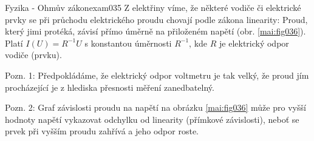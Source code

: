 \begin{mathexam}{Fyzika - Ohmův zákon}{exam035}
  Z elektřiny víme, že některé vodiče či elektrické prvky se při průchodu elektrického proudu
  chovají podle zákona linearity: Proud, který jimi protéká, závisí přímo úměrně na přiloženém
  napětí (obr. \ref{mai:fig036}). Platí \(I(U) = R^{-1 }U\) s konstantou úměrnosti \(R^{-1}\), kde
  \(R\) je elektrický odpor vodiče (prvku).

  Pozn. 1: Předpokládáme, že elektrický odpor voltmetru je tak velký, že proud jím procházející je z
  hlediska přesnosti měření zanedbatelný.
  
  Pozn. 2: Graf závislosti proudu na napětí na obrázku \ref{mai:fig036} může pro vyšší hodnoty 
  napětí vykazovat odchylku od linearity (přímkové závislosti), neboť se prvek při vyšším proudu 
  zahřívá a jeho odpor roste.
  
  {\centering
    \captionsetup{type=figure}
    \par}  
\end{mathexam}
